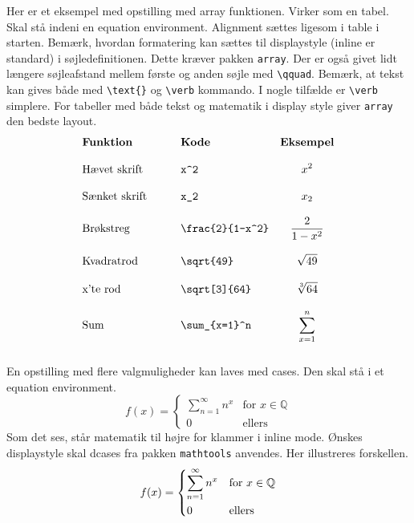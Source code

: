 \documentclass{article}
\begin{document}
Her er et eksempel med opstilling med array funktionen. Virker som en tabel. Skal stå indeni en equation environment. Alignment sættes ligesom i table i starten. Bemærk, hvordan formatering kan sættes til displaystyle (inline er standard) i søjledefinitionen. Dette kræver pakken \verb"array". Der er også givet lidt længere søjleafstand mellem første og anden søjle med \verb"\qquad". Bemærk, at tekst kan gives både med \verb"\text{}" og \verb"\verb" kommando. I nogle tilfælde er \verb"\verb" simplere. For tabeller med både tekst og matematik i display style giver \verb"array" den bedste layout.
\begin{equation*}
\begin{array}{l >{\qquad}l >{\displaystyle}c}
\textbf{Funktion}&\textbf{Kode}&\textbf{Eksempel}\\\\
\text{Hævet skrift}	&\verb"x^2"			& x^2  \\\\
\text{Sænket skrift}	&\verb"x_2"			&x_2 \\\\
\text{Brøkstreg}	&\verb"\frac{2}{1-x^2}"	&\frac{2}{1-x^2}\\\\
\text{Kvadratrod}	&\verb"\sqrt{49}"		&\sqrt{49} \\\\
\text{x'te rod}		&\verb"\sqrt[3]{64}"		&\sqrt[3]{64} \\\\
\text{Sum}		&\verb"\sum_{x=1}^n"	&\sum_{x=1}^n\\\\
\end{array}
\end{equation*}
En opstilling med flere valgmuligheder kan laves med cases.
Den skal stå i et equation environment. 
\begin{equation*}
f(x)=
\begin{cases}
\sum_{n=1}^\infty n^x & \text{for } x\in \mathbb{Q}\\
0&\text{ellers}
\end{cases}
\end{equation*}
Som det ses, står matematik til højre for klammer i inline mode. Ønskes displaystyle skal dcases fra pakken \verb"mathtools" anvendes. Her illustreres forskellen.
\begin{equation*}
f(x)=
\begin{dcases}
\sum_{n=1}^\infty n^x & \text{for } x\in \mathbb{Q}\\
0&\text{ellers}
\end{dcases}
\end{equation*}
\end{document}
